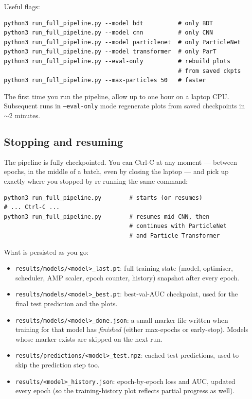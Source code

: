 \documentclass[11pt,a4paper]{article}
\begin{document}
Useful flags:
\begin{lstlisting}[style=shell]
python3 run_full_pipeline.py --model bdt          # only BDT
python3 run_full_pipeline.py --model cnn          # only CNN
python3 run_full_pipeline.py --model particlenet  # only ParticleNet
python3 run_full_pipeline.py --model transformer  # only ParT
python3 run_full_pipeline.py --eval-only          # rebuild plots
                                                  # from saved ckpts
python3 run_full_pipeline.py --max-particles 50   # faster
\end{lstlisting}

\begin{tipbox}
The first time you run the pipeline, allow up to one hour on a
laptop CPU. Subsequent runs in \texttt{--eval-only} mode regenerate
plots from saved checkpoints in $\sim\!2$ minutes.
\end{tipbox}

\subsection{Stopping and resuming}\label{sec:resume}
The pipeline is fully checkpointed. You can Ctrl-C at any moment ---
between epochs, in the middle of a batch, even by closing the
laptop --- and pick up exactly where you stopped by re-running the
same command:
\begin{lstlisting}[style=shell]
python3 run_full_pipeline.py        # starts (or resumes)
# ... Ctrl-C ...
python3 run_full_pipeline.py        # resumes mid-CNN, then
                                    # continues with ParticleNet
                                    # and Particle Transformer
\end{lstlisting}

What is persisted as you go:
\begin{itemize}
  \item \texttt{results/models/<model>\_last.pt}: full training state
        (model, optimiser, scheduler, AMP scaler, epoch counter,
        history) snapshot after every epoch.
  \item \texttt{results/models/<model>\_best.pt}: best-val-AUC
        checkpoint, used for the final test prediction and the plots.
  \item \texttt{results/models/<model>\_done.json}: a small marker
        file written when training for that model has \emph{finished}
        (either max-epochs or early-stop).  Models whose marker
        exists are skipped on the next run.
  \item \texttt{results/predictions/<model>\_test.npz}: cached test
        predictions, used to skip the prediction step too.
  \item \texttt{results/<model>\_history.json}: epoch-by-epoch loss
        and AUC, updated every epoch (so the training-history plot
        reflects partial progress as well).
\end{itemize}
\end{document}

